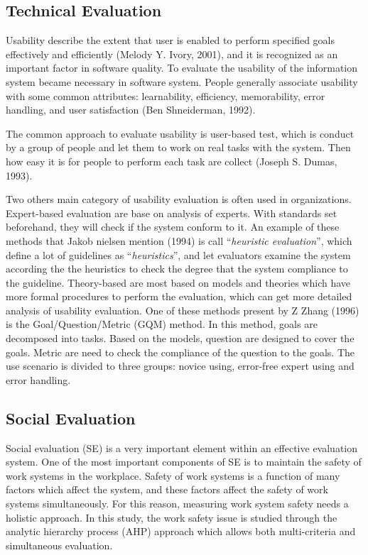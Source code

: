 \documentclass[twocolumn]{article}
\begin{document}
\subsection{Technical Evaluation}
Usability describe the extent that user is enabled to perform specified goals effectively and efficiently (Melody Y. Ivory, 2001), and it is recognized as an important factor in software quality. To evaluate the usability of the information system became necessary in software system. People generally associate usability with some common attributes: learnability, efficiency, memorability, error handling, and user satisfaction (Ben Shneiderman, 1992).

The common approach to evaluate usability is user-based test, which is conduct by a group of people and let them to work on real tasks with the system. Then how easy it is for people to perform each task are collect (Joseph S. Dumas, 1993).

Two others main category of usability evaluation is often used in organizations. Expert-based evaluation are base on analysis of experts. With standards set beforehand, they will check if the system conform to it. An example of these methods that Jakob nielsen mention (1994) is call “\emph{heuristic evaluation}”, which define a lot of guidelines as “\emph{heuristics}”, and let evaluators examine the system according the the heuristics to check the degree that the system compliance to the guideline. Theory-based are most based on models and theories which have more formal procedures to perform the evaluation, which can get more detailed analysis of usability evaluation. One of these methods present by Z Zhang (1996) is the Goal/Question/Metric (GQM) method. In this method, goals are decomposed into tasks. Based on the models, question are designed to cover the goals. Metric are need to check the compliance of the question to the goals. The use scenario is divided to three groups: novice using, error-free expert using and error handling.

\subsection{Social Evaluation}
Social evaluation (SE) is a very important element within an effective evaluation system. One of the most important components of SE is to maintain the safety of work systems in the workplace. Safety of work systems is a function of many factors which affect the system, and these factors affect the safety of work systems simultaneously. For this reason, measuring work system safety needs a holistic approach. In this study, the work safety issue is studied through the analytic hierarchy process (AHP) approach which allows both multi-criteria and simultaneous evaluation. 
\end{document}
